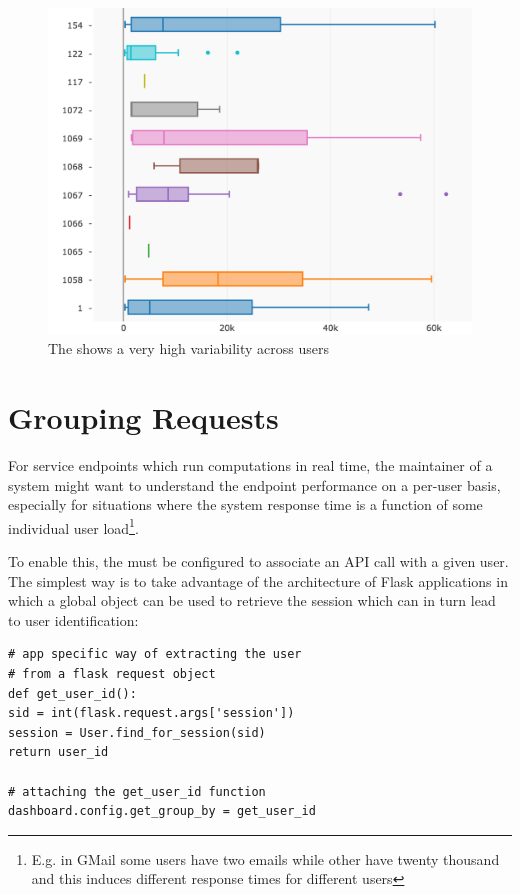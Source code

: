 \documentclass[conference]{IEEEtran}
\begin{document}
  





\begin{figure}[!ht]
  \centering
  \includegraphics[width=0.4\linewidth]{time_per_user}
  \caption{The \epFeedItems shows a very high variability across users}
  \label{fig:tpu}
\end{figure}

\newpage
\section{Grouping Requests}
\label{sec:user}

For service endpoints which run computations in real time, the maintainer of a system might want to understand the endpoint performance on a per-user basis, especially for situations where the system response time is a function of some individual user load\footnote{E.g. in GMail some users have two emails while other have twenty thousand and this induces different response times for different users}.


To enable this, the \tool must be configured to associate an API call with a given user. The simplest way is to take advantage of the architecture of Flask applications in which a global  object can be used to retrieve the session which can in turn lead to user identification: 

\begin{lstlisting}[style=custompython]  
# app specific way of extracting the user
# from a flask request object    
def get_user_id():
sid = int(flask.request.args['session'])
session = User.find_for_session(sid)
return user_id

# attaching the get_user_id function
dashboard.config.get_group_by = get_user_id

\end{lstlisting}
\end{document}
